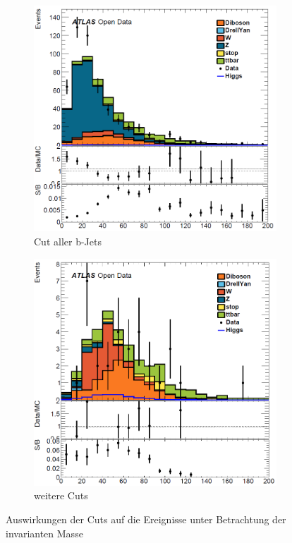 \begin{figure}[h]
\begin{subfigure}{.5\textwidth}
\includegraphics[width=.8\linewidth]{../Pictures/Auswertung/2cut_mass.png}
\caption{Cut aller b-Jets}
\end{subfigure}%
\begin{subfigure}{.5\textwidth}
\centering
\includegraphics[width=.8\linewidth]{../Pictures/Auswertung/3cut_mass.png}
\caption{weitere Cuts}
\end{subfigure}%
\caption{Auswirkungen der Cuts auf die Ereignisse unter Betrachtung der invarianten Masse}
\label{Cuts_mass}
\end{figure}

